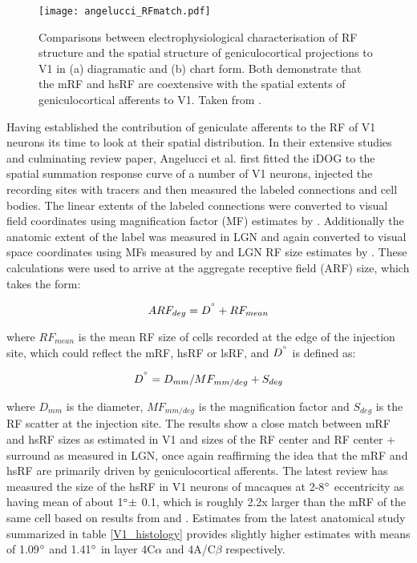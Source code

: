 \begin{figure}
	\centering
        \texttt{[image: angelucci\_RFmatch.pdf]}
	\caption{Comparisons between electrophysiological
        characterisation of RF structure and the spatial structure of
        geniculocortical projections to V1 in (a) diagramatic and (b)
        chart form. Both demonstrate that the mRF and hsRF are
        coextensive with the spatial extents of geniculocortical
        afferents to V1. Taken from \cite{Angelucci2006}.}
	\label{FFmatch}
\end{figure}

Having established the contribution of geniculate afferents to the RF
of V1 neurons its time to look at their spatial distribution. In their
extensive studies and culminating review paper, Angelucci et al.
\cite{Angelucci2006} first fitted the iDOG to the spatial summation
response curve of a number of V1 neurons, injected the recording sites
with tracers and then measured the labeled connections and cell
bodies. The linear extents of the labeled connections were converted
to visual field coordinates using magnification factor (MF) estimates
by \cite{VanEssen1984}. Additionally the anatomic extent of the label
was measured in LGN and again converted to visual space coordinates
using MFs measured by \cite{Connolly1984} and LGN RF size estimates by
\cite{Derrington1984}. These calculations were used to arrive at the
aggregate receptive field (ARF) size, which takes the form:

\begin{equation}
  ARF_{deg} = D^{\degree} + RF_{mean}
\end{equation}

where $RF_{mean}$ is the mean RF size of cells recorded at the edge of
the injection site, which could reflect the mRF, hsRF or lsRF, and
$D^{\degree}$ is defined as:

\begin{equation}
  D^{\degree} = D_{mm} / MF_{mm/deg} + S_{deg}
\end{equation}

where $D_{mm}$ is the diameter, $MF_{mm/deg}$ is the magnification
factor and $S_{deg}$ is the RF scatter at the injection site. The
results show a close match between mRF and hsRF sizes as estimated in
V1 and sizes of the RF center and RF center + surround as measured in
LGN, once again reaffirming the idea that the mRF and hsRF are
primarily driven by geniculocortical afferents. The latest review
\citep{Angelucci2006} has measured the size of the hsRF in V1 neurons
of macaques at 2-8$\degree$ eccentricity as having mean of about
1$\degree \pm$ 0.1, which is roughly 2.2x larger than the mRF of the
same cell based on results from \cite{Angelucci2002} and
\cite{Levitt2002}. Estimates from the latest anatomical study
summarized in table \ref{V1_histology} provides slightly higher
estimates with means of 1.09$\degree$ and 1.41$\degree$ in layer
4C$\alpha$ and 4A/C$\beta$ respectively.

